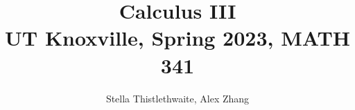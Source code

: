 \documentclass[math]{amznotes}
\title{\textbf{Calculus III}\\
\large UT Knoxville, Spring 2023, MATH 341}
\author{Stella Thistlethwaite, Alex Zhang}
\begin{document}
\maketitle
\tableofcontents



\amzindex
\end{document}
